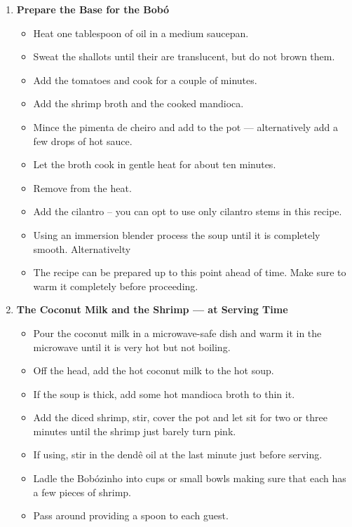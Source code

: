 \documentclass[11pt,letterpaper]{article}
\begin{document}
\begin{description}
\begin{enumerate}
	\item {\bf Prepare the Base for the Bob\'o}
	\begin{itemize}
	\item Heat one tablespoon of oil in a medium saucepan.
	\item Sweat the shallots until their are translucent, but do not brown them.
	\item Add the tomatoes and cook for a couple of minutes.
	\item Add the shrimp broth and the cooked mandioca.
	\item Mince the pimenta de cheiro and add to the pot --- alternatively add a few drops of hot sauce.
	\item Let the broth cook in gentle heat for about ten minutes.
	\item Remove from the heat.
	\item Add the cilantro -- you can opt to use only cilantro stems in this recipe.
	\item Using an immersion blender process the soup until it is completely smooth. Alternativelty
	\item The recipe can be prepared up to this point ahead of time. Make sure to warm it completely before proceeding.
	\end{itemize}
	\item {\bf The Coconut Milk and the Shrimp --- at Serving Time}
	\begin{itemize}
	\item Pour the coconut milk in a microwave-safe dish and warm it in the microwave until it is very hot but not boiling.
	\item Off the head, add the hot coconut milk to the hot soup.
	\item If the soup is thick, add some hot mandioca broth to thin it.
	\item Add the diced shrimp, stir, cover the pot and let sit for two or three minutes until the shrimp just barely turn pink.
	\item If using, stir in the dend\^e oil at the last minute just before serving.
	\item Ladle the Bob\'ozinho into cups or small bowls making sure that each has a few pieces of shrimp. 
	\item Pass around providing a spoon to each guest.
	\end{itemize}
	\end{enumerate}
\end{description}
\end{document}
